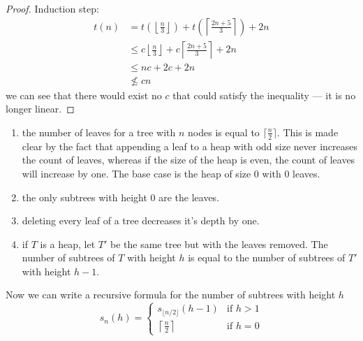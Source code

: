 \documentclass{article}
\begin{document}
\begin{tasks}
{\begin{enumerate}[label={(\arabic*)}]
{\begin{proof}
                        Induction step:
                        \begin{displaymath}
                            \begin{aligned}
                                t(n)
                                &= t\left(\left\lfloor\frac{n}{3}\right\rfloor\right) + t\left(\left\lceil\frac{2n+5}{3}\right\rceil\right) + 2n \\
                                &\leq c\left\lfloor\frac{n}{3}\right\rfloor + c\left\lceil\frac{2n+5}{3}\right\rceil + 2n\\
                                &\leq nc + 2c + 2n \\
                                &\not\leq cn
                            \end{aligned}
                        \end{displaymath}
                        we can see that there would exist no \(c\) that could satisfy the inequality --- it is no longer linear.
                    \end{proof}
                }
            \end{enumerate}
        }
        \item {
            \begin{enumerate}
                \item {
                    the number of leaves for a tree with 
                    \(n\) nodes is equal to \(\lceil\frac{n}{2}\rceil\). 
                    This is made clear by the fact that appending a leaf
                    to a heap with odd size never increases the count of 
                    leaves, whereas if the size of the heap is even, the
                    count of leaves will increase by one. The base case
                    is the heap of size 0 with 0 leaves.
                }
                \item {
                    the only subtrees with height 0 are the leaves.
                }
                \item {
                    deleting every leaf of a tree decreases it's depth by one.
                }
                \item {
                    if \(T\) is a heap, let \(T'\) be the same tree but 
                    with the leaves removed. The number of subtrees of 
                    \(T\) with height \(h\) is equal to the number of subtrees
                    of \(T'\) with height \(h-1\).
                }
            \end{enumerate}
            Now we can write a recursive formula for the number of subtrees with height \(h\)
            \begin{displaymath}
                s_n(h) = \begin{cases}
                    s_{\lfloor n/2\rfloor}(h - 1) & \text{if } h > 1 \\
                    \left\lceil\frac{n}{2}\right\rceil & \text{if } h = 0
                \end{cases}
            \end{displaymath}

}
\end{tasks}
\end{document}
